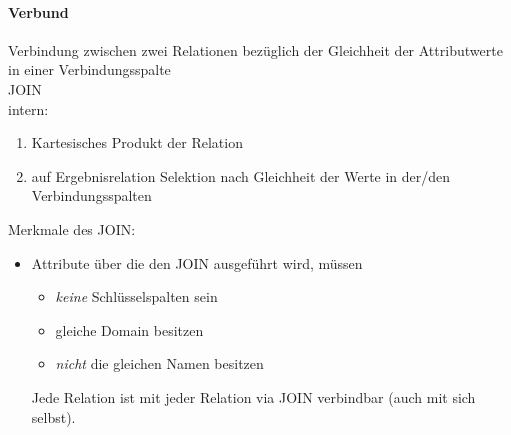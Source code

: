 \paragraph{Verbund} Verbindung zwischen zwei Relationen bezüglich der Gleichheit der Attributwerte in einer Verbindungsspalte\\
JOIN\\
intern:
\begin{enumerate}
\item Kartesisches Produkt der Relation
\item auf Ergebnisrelation Selektion nach Gleichheit der Werte in der/den Verbindungsspalten
\end{enumerate}
Merkmale des JOIN:
\begin{itemize}
\item Attribute über die den JOIN ausgeführt wird, müssen
\begin{itemize}
\item \emph{keine} Schlüsselspalten sein
\item gleiche Domain besitzen
\item \emph{nicht} die gleichen Namen besitzen
\end{itemize}
Jede Relation ist mit jeder Relation via JOIN verbindbar (auch mit sich selbst).
\end{itemize}







